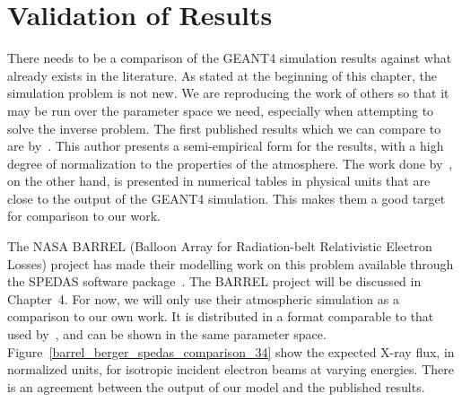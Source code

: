 \section{Validation of Results}

There needs to be a comparison of the GEANT4 simulation results against what already exists in the literature. As stated at the beginning of this chapter, the simulation problem is not new. We are reproducing the work of others so that it may be run over the parameter space we need, especially when attempting to solve the inverse problem. The first published results which we can compare to are by~\citet{Rees1963}. This author presents a semi-empirical form for the results, with a high degree of normalization to the properties of the atmosphere. The work done by~\cite{Berger1972}, on the other hand, is presented in numerical tables in physical units that are close to the output of the GEANT4 simulation. This makes them a good target for comparison to our work. 

The NASA BARREL (Balloon Array for Radiation-belt Relativistic Electron Losses) project has made their modelling work on this problem available through the SPEDAS software package~\citep{Angelopoulos2019}. The BARREL project will be discussed in Chapter~4. For now, we will only use their atmospheric simulation as a comparison to our own work. It is distributed in a format comparable to that used by~\cite{Berger1972}, and can be shown in the same parameter space. Figure~\ref{barrel_berger_spedas_comparison_34} show the expected X-ray flux, in normalized units, for isotropic incident electron beams at varying energies. There is an agreement between the output of our model and the published results. 

